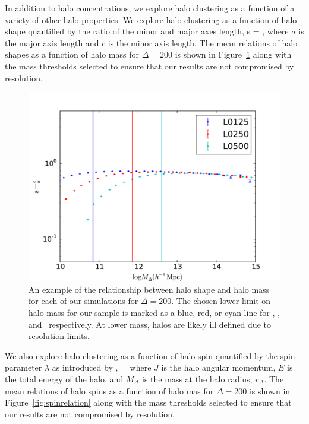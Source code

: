 \documentclass[usenatbib,usegraphicx,letterpaper]{mn2e}
\begin{document}
In addition to halo concentrations, we explore halo clustering as a function of a variety of other 
halo properties. We explore halo clustering as a function of halo shape quantified by the ratio of 
the minor and major axes length, 
\beq
s = ,
\eeq
where $a$ is the major axis length and $c$ is the minor axis length. The mean relations of halo shapes 
as a function of halo mass for $\Delta=200$ is shown in Figure~\ref{fig:srelation} along with the mass 
thresholds selected to ensure that our results are not compromised by resolution.


\begin{figure}
\centering
\includegraphics[width=.5\textwidth]{masscut_shape_d200.pdf}
\caption{
An example of the relationship between halo shape and 
halo mass for each of our simulations for $\Delta =200$. The chosen 
lower limit on halo mass for our sample is marked as a blue, red, or 
cyan line for \simA, \simB, and \simC \ respectively. At lower mass, 
halos are likely ill defined due to resolution limits.
}
\label{fig:srelation}
\end{figure}

We also explore halo clustering as a function of halo spin quantified 
by the spin parameter $\lambda$ as introduced by \citep{peebles69},
\beq
\lambda = 
\eeq
where $J$ is the halo angular momentum, $E$ is the total energy of the 
halo, and $M_{\Delta}$ is the mass at the halo radius, $r_{\Delta}$. 
The mean relations of halo spins as a function of halo mas for $\Delta=200$ 
is shown in Figure~\ref{fig:spinrelation} along with the mass thresholds 
selected to ensure that our results are not compromised by resolution.
\end{document}
